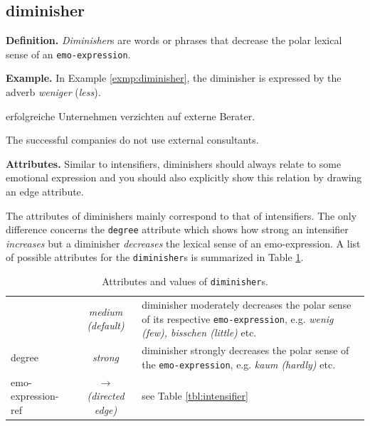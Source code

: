 \subsection{diminisher}
\noindent\textbf{Definition.} \emph{Diminisher}s are words or phrases
that decrease the polar lexical sense of an \texttt{emo-expression}.

\noindent\textbf{Example.} In Example \ref{exmp:diminisher}, the
diminisher is expressed by the adverb \textit{weniger}
(\textit{less}).
\begin{example}
   erfolgreiche Unternehmen verzichten auf externe
  Berater.\label{exmp:diminisher}

  The  successful companies do not use external
  consultants.
\end{example}
\noindent\textbf{Attributes.} Similar to intensifiers, diminishers
should always relate to some emotional expression and you should also
explicitly show this relation by drawing an edge attribute.

The attributes of diminishers mainly correspond to that of
intensifiers.  The only difference concerns the \texttt{degree}
attribute which shows how strong an intensifier \emph{increases} but a
diminisher \emph{decreases} the lexical sense of an emo-expression.  A
list of possible attributes for the \texttt{diminisher}s is summarized
in Table \ref{tbl:diminisher}.
\begin{center}
  \begin{table}[hb]
    \caption{Attributes and values of \texttt{diminisher}s.}
    \begin{tabular}{|l|c|p{0.88\clmnwidth}|}\hline

      & \textit{medium (default)} & diminisher moderately decreases
      the polar sense of its respective \texttt{emo-expression},
      e.g. \textit{wenig (few), bisschen (little)} etc.\\\cline{2-3}

      \multirow{-2}{*}{degree} & \textit{strong} & diminisher strongly
      decreases the polar sense of the \texttt{emo-expression},
      e.g. \textit{kaum (hardly)} etc.\\\hline

      emo-expression-ref & \textit{$\longrightarrow$\newline(directed
        edge)} & see Table \ref{tbl:intensifier}\\\hline
    \end{tabular}
    \label{tbl:diminisher}
  \end{table}
\end{center}

